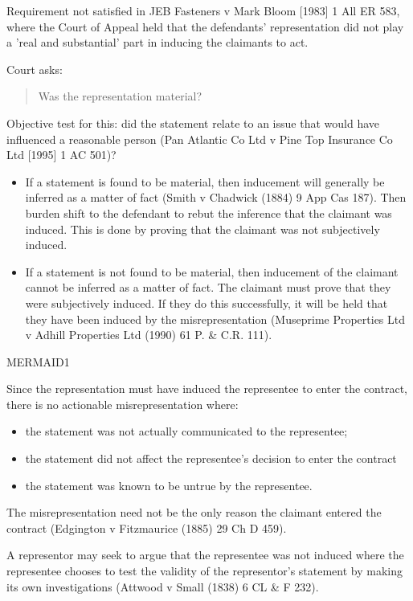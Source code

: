\documentclass[
]{article}
\providecommand{\tightlist}{%
  \setlength{\itemsep}{0pt}\setlength{\parskip}{0pt}}
\begin{document}
Requirement not satisfied in JEB Fasteners v Mark Bloom {[}1983{]} 1 All
ER 583, where the Court of Appeal held that the defendants'
representation did not play a 'real and substantial' part in inducing
the claimants to act.

Court asks:

\begin{quote}
Was the representation material?
\end{quote}

Objective test for this: did the statement relate to an issue that would
have influenced a reasonable person (Pan Atlantic Co Ltd v Pine Top
Insurance Co Ltd {[}1995{]} 1 AC 501)?

\begin{itemize}
\tightlist
\item
  If a statement is found to be material, then inducement will generally
  be inferred as a matter of fact (Smith v Chadwick (1884) 9 App Cas
  187). Then burden shift to the defendant to rebut the inference that
  the claimant was induced. This is done by proving that the claimant
  was not subjectively induced.
\item
  If a statement is not found to be material, then inducement of the
  claimant cannot be inferred as a matter of fact. The claimant must
  prove that they were subjectively induced. If they do this
  successfully, it will be held that they have been induced by the
  misrepresentation (Museprime Properties Ltd v Adhill Properties Ltd
  (1990) 61 P. \& C.R. 111).
\end{itemize}

MERMAID1

Since the representation must have induced the representee to enter the
contract, there is no actionable misrepresentation where:

\begin{itemize}
\tightlist
\item
  the statement was not actually communicated to the representee;
\item
  the statement did not affect the representee's decision to enter the
  contract
\item
  the statement was known to be untrue by the representee.
\end{itemize}

The misrepresentation need not be the only reason the claimant entered
the contract (Edgington v Fitzmaurice (1885) 29 Ch D 459).

A representor may seek to argue that the representee was not induced
where the representee chooses to test the validity of the representor's
statement by making its own investigations (Attwood v Small (1838) 6 CL
\& F 232).
\end{document}
